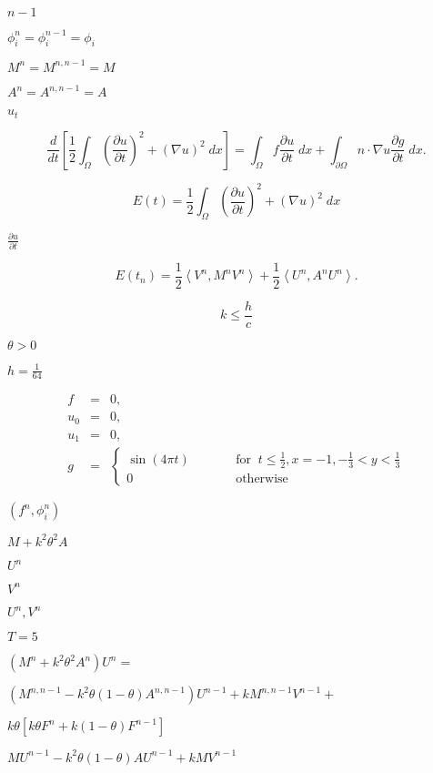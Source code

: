 \documentclass{article}
\begin{document}
$n-1$
\pagebreak

$\phi^n_i=\phi_i^{n-1}=\phi_i$
\pagebreak

$M^n=M^{n,n-1}=M$
\pagebreak

$A^n=A^{n,n-1}=A$
\pagebreak

$u_t$
\pagebreak

\[ \frac{d}{d t} \left[\frac 12 \int_\Omega \left(\frac{\partial u}{\partial t}\right)^2 + (\nabla u)^2 \; dx\right] = \int_\Omega f \frac{\partial u}{\partial t} \; dx + \int_{\partial\Omega} n\cdot\nabla u \frac{\partial g}{\partial t} \; dx. \]
\pagebreak

\[ E(t) = \frac 12 \int_\Omega \left(\frac{\partial u}{\partial t}\right)^2 + (\nabla u)^2 \; dx \]
\pagebreak

$\frac{\partial u}{\partial t}$
\pagebreak

\[ E(t_n) = \frac 12 \left<V^n, M^n V^n\right> + \frac 12 \left<U^n, A^n U^n\right>. \]
\pagebreak

\[ k\le \frac hc \]
\pagebreak

$\theta>0$
\pagebreak

$h=\frac 1{64}$
\pagebreak

\begin{eqnarray*} f &=& 0, \\ u_0 &=& 0, \\ u_1 &=& 0, \\ g &=& \left\{\begin{matrix}\sin (4\pi t) &\qquad& \text{for }\ t\le \frac 12, x=-1, -\frac 13<y<\frac 13 \\ 0 &&\text{otherwise} \end{matrix} \right. \end{eqnarray*}
\pagebreak

$(f^n,\phi^n_i)$
\pagebreak

$M+k^2\theta^2A$
\pagebreak

$U^n$
\pagebreak

$V^n$
\pagebreak

$U^n,V^n$
\pagebreak

$T=5$
\pagebreak

$(M^n + k^2\theta^2 A^n)U^n =$
\pagebreak

$(M^{n,n-1} - k^2\theta(1-\theta) A^{n,n-1})U^{n-1} + kM^{n,n-1}V^{n-1} +$
\pagebreak

$k\theta \left[k \theta F^n + k(1-\theta) F^{n-1} \right]$
\pagebreak

$MU^{n-1} - k^2\theta(1-\theta) AU^{n-1} + kMV^{n-1}$
\pagebreak
\end{document}
